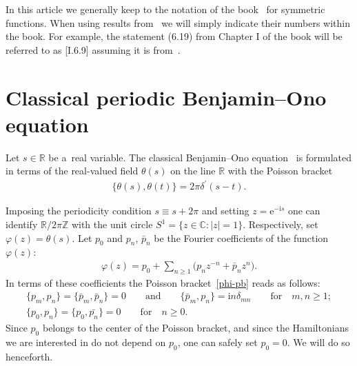 \documentclass[pdftex]{sigma}
\numberwithin{equation}{section}
\renewcommand\ge{\geqslant}
\newcommand\abs[1]{\left|#1\right|}
\begin{document}
In this article we generally keep to the notation of the book~\cite{M} for symmetric functions.
When using results from~\cite{M} we will simply indicate their numbers within the book.
For example, the statement (6.19) from Chapter I of the book will be referred to as [I.6.9] assuming it is
from~\cite{M}.

\section[Classical periodic Benjamin-Ono equation]{Classical periodic Benjamin--Ono equation}\label{Section2}

Let $s\in\mathbb R$ be a~real variable.
The classical Benjamin--Ono equation~\cite{AFSS,B,KLM,KM,O} is formulated in terms of the real-valued
f\/ield $\theta(s)$ on the line $\mathbb R$ with the Poisson bracket
\begin{gather}
\label{phi-pb}
\{\theta(s),\theta(t)\}=2\pi\delta^{\prime}(s-t).
\end{gather}

Imposing the periodicity condition $s\equiv s+2\pi$ and setting $z=\mathrm{e}^{-\mathrm{i}
s}$ one can identify $\mathbb R/2\pi\mathbb Z$ with the unit circle $S^1=\{z\in\mathbb C:\abs{z}=1\}$.
Respectively, set $\varphi(z)=\theta(s)$.
Let $p_0$ and $p_n$, $\bar{p}_n$ be the Fourier coef\/f\/icients of the function~$\varphi(z)$:
\begin{gather*}
\varphi(z)=p_0+\sum_{n\ge1}\big(p_nz^{-n}+\bar{p}_nz^n\big).
\end{gather*}
In terms of these coef\/f\/icients the Poisson bracket~\eqref{phi-pb} reads as follows:
\begin{gather*}
\{p_m,p_n\}=\{\bar{p}_m,\bar{p}_n\}=0
\qquad
\text{and}
\qquad
\{\bar{p}_m,p_n\}=\mathrm{i}n\delta_{mn}
\qquad
\text{for}
\quad
m,n\ge1;
\\
\{p_0,p_n\}=\{p_0,\bar{p_n}\}=0
\qquad
\text{for}
\quad
n\ge0.
\end{gather*}
Since $p_0$ belongs to the center of the Poisson bracket, and since the Hamiltonians we are interested in
do not depend on $p_0$, one can safely set $p_0=0$.
We will do so henceforth.
\end{document}
